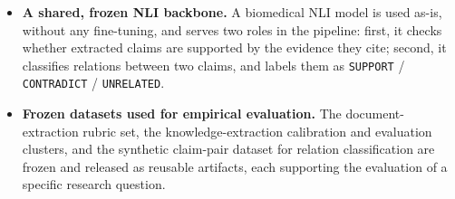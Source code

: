 \begin{itemize}[label={},leftmargin=1.5em]
    \item \textbf{A shared, frozen NLI backbone.} A biomedical NLI model is used as-is, without any fine-tuning, and serves two roles in the pipeline: first, it checks whether extracted claims are supported by the evidence they cite; second, it classifies relations between two claims, and labels them as \texttt{SUPPORT} / \texttt{CONTRADICT} / \texttt{UNRELATED}.

    \item \textbf{Frozen datasets used for empirical evaluation.} The document-extraction rubric set, the knowledge-extraction calibration and evaluation clusters, and the synthetic claim-pair dataset for relation classification are frozen and released as reusable artifacts, each supporting the evaluation of a specific research question.
\end{itemize}
